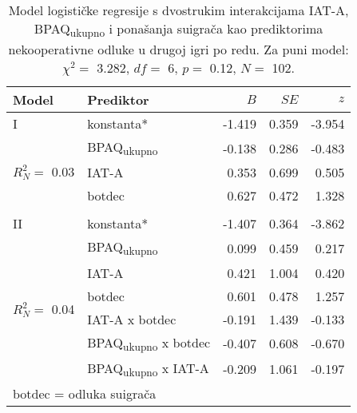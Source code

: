 \documentclass[a4paper, 12pt]{report}
\begin{document}
\begin{table}
    \begin{center}
        \caption{\label{glmtotgam22} Model logističke regresije s dvostrukim interakcijama IAT-A,
            BPAQ\textsubscript{ukupno} i ponašanja suigrača kao prediktorima
            nekooperativne odluke u drugoj igri po redu. Za puni
            model: $\chi^2 =$
            3.282, $df =$ 6, $p =$ 0.12, $N =$ 102.}
        \hspace*{-0.5cm}\begin{tabular}{llrrr}
        \toprule
        Model & Prediktor & $B$ & $SE$ & $z$\\
        \midrule
        I & konstanta* & -1.419 & 0.359 & -3.954 \\
        \multirow{3}{*}{$R^2_N =$ 0.03}
        &BPAQ\textsubscript{ukupno} & -0.138 & 0.286 & -0.483 \\
        &IAT-A & 0.353 & 0.699 & 0.505 \\
        &botdec & 0.627 & 0.472 & 1.328 \\
        &&&&\\ 
        II & konstanta* & -1.407 & 0.364 & -3.862 \\
        \multirow{6}{*}{$R^2_N =$ 0.04}
        &BPAQ\textsubscript{ukupno} & 0.099 & 0.459 & 0.217 \\
        &IAT-A & 0.421 & 1.004 & 0.420 \\
        &botdec & 0.601 & 0.478 & 1.257  \\
        &IAT-A x botdec & -0.191 & 1.439 & -0.133 \\
        &BPAQ\textsubscript{ukupno} x botdec & -0.407 & 0.608 & -0.670 \\
        &BPAQ\textsubscript{ukupno} x IAT-A & -0.209 & 1.061 & -0.197 \\
        \bottomrule
        \multicolumn{5}{l}{
            \parbox{3cm}{\scriptsize \vspace{3pt} 
                botdec = odluka suigrača
        }}
    \end{tabular}
\end{center}
\end{table}
\end{document}
